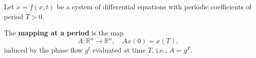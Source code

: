 Let $\dot{x} = f(x, t)$ be a system of differential equations with periodic coefficients of period $T > 0$.

The \textbf{mapping at a period} is the map
$$A: \mathbb{R}^n \rightarrow \mathbb{R}^n, \quad Ax(0) = x(T),$$
induced by the phase flow $g^t$ evaluated at time $T$, i.e., $A = g^T$.

